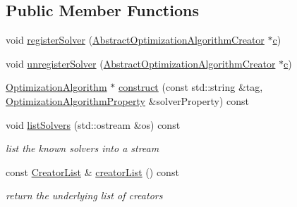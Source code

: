 \subsection*{Public Member Functions}
\begin{DoxyCompactItemize}
\item 
void \hyperlink{classg2o_1_1OptimizationAlgorithmFactory_a7726ae90dc3d5baf62fa364517e0fed7}{register\+Solver} (\hyperlink{classg2o_1_1AbstractOptimizationAlgorithmCreator}{Abstract\+Optimization\+Algorithm\+Creator} $\ast$\hyperlink{sparse__helper_8cpp_a4e1e0e72dd773439e333c84dd762a9c3}{c})
\item 
void \hyperlink{classg2o_1_1OptimizationAlgorithmFactory_adf79430f6176c9e9309a703ba2dbd14b}{unregister\+Solver} (\hyperlink{classg2o_1_1AbstractOptimizationAlgorithmCreator}{Abstract\+Optimization\+Algorithm\+Creator} $\ast$\hyperlink{sparse__helper_8cpp_a4e1e0e72dd773439e333c84dd762a9c3}{c})
\item 
\hyperlink{classg2o_1_1OptimizationAlgorithm}{Optimization\+Algorithm} $\ast$ \hyperlink{classg2o_1_1OptimizationAlgorithmFactory_aa386e02f78023241e557aa9135ba42d2}{construct} (const std\+::string \&tag, \hyperlink{structg2o_1_1OptimizationAlgorithmProperty}{Optimization\+Algorithm\+Property} \&solver\+Property) const 
\item 
void \hyperlink{classg2o_1_1OptimizationAlgorithmFactory_a71e42179f0138bd00de1a4aa02c7f83a}{list\+Solvers} (std\+::ostream \&os) const 
\begin{DoxyCompactList}\small\item\em list the known solvers into a stream \end{DoxyCompactList}\item 
const \hyperlink{classg2o_1_1OptimizationAlgorithmFactory_a3ed210b94bf09b47e30d07da3766b4ec}{Creator\+List} \& \hyperlink{classg2o_1_1OptimizationAlgorithmFactory_a0f86ea4b415f6ac6854324be09eea8fa}{creator\+List} () const 
\begin{DoxyCompactList}\small\item\em return the underlying list of creators \end{DoxyCompactList}\end{DoxyCompactItemize}
